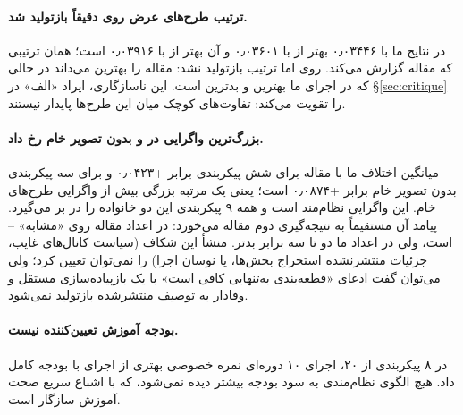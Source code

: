 \paragraph{ترتیب طرح‌های عرض روی  دقیقاً بازتولید شد.} در نتایج ما  با \num{۰٫۰۳۴۴۶} بهتر از  با \num{۰٫۰۳۶۰۱} و آن بهتر از  با \num{۰٫۰۳۹۱۶} است؛ همان ترتیبی که مقاله گزارش می‌کند. روی  اما ترتیب بازتولید نشد: مقاله  را بهترین می‌داند در حالی که در اجرای ما  بهترین و  بدترین است. این ناسازگاری، ایراد «الف» در \S\ref{sec:critique} را تقویت می‌کند: تفاوت‌های کوچک میان این طرح‌ها پایدار نیستند.

\paragraph{بزرگ‌ترین واگرایی در  و  بدون تصویر خام رخ داد.} میانگین اختلاف ما با مقاله برای شش پیکربندی  برابر \num{+۰٫۰۴۲۳} و برای سه پیکربندی  بدون تصویر خام برابر \num{+۰٫۰۸۷۴} است؛ یعنی یک مرتبه بزرگی بیش از واگرایی طرح‌های خام. این واگرایی نظام‌مند است و همه ۹ پیکربندی این دو خانواده را در بر می‌گیرد. پیامد آن مستقیماً به نتیجه‌گیری دوم مقاله می‌خورد: در اعداد مقاله  روی  «مشابه» -- است، ولی در اعداد ما دو تا سه برابر بدتر. منشأ این شکاف (سیاست کانال‌های غایب، جزئیات منتشرنشده استخراج بخش‌ها، یا نوسان اجرا) را نمی‌توان تعیین کرد؛ ولی می‌توان گفت ادعای «قطعه‌بندی به‌تنهایی کافی است» با یک بازپیاده‌سازی مستقل و وفادار به توصیف منتشرشده بازتولید نمی‌شود.

\paragraph{بودجه آموزش تعیین‌کننده نیست.} در ۸ پیکربندی از ۲۰، اجرای ۱۰ دوره‌ای نمره خصوصی بهتری از اجرای با بودجه کامل داد. هیچ الگوی نظام‌مندی به سود بودجه بیشتر دیده نمی‌شود، که با اشباع سریع صحت آموزش سازگار است.

